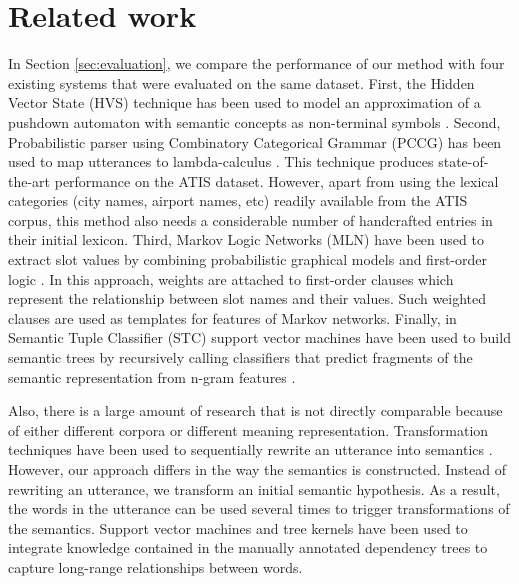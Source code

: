 \documentclass{article}
\begin{document}
\section{Related work}

In Section \ref{sec:evaluation}, we compare the performance of our method with four existing systems that were evaluated on the same dataset. 
First, the Hidden Vector State (HVS) technique has been used to model an approximation of a pushdown automaton with semantic concepts as non-terminal symbols \cite{he05,jurcicek08}. 
Second, Probabilistic parser using Combinatory Categorical Grammar   (PCCG) has been used to map utterances to lambda-calculus \cite{zettlemoyer07}. 
This technique produces state-of-the-art performance on the ATIS dataset. However, apart from using the lexical categories (city names, airport names, etc) readily available from the ATIS corpus, this method also needs a considerable number of handcrafted entries in their initial lexicon. 
Third, Markov Logic Networks (MLN) have been used to extract slot values by combining probabilistic graphical models and first-order logic \cite{meza08b}. In this approach, weights are attached to first-order clauses which represent the relationship between slot names and their values. Such weighted clauses are used as templates for features of Markov networks.
Finally, in Semantic Tuple Classifier (STC) support vector machines have been used to build semantic trees by recursively calling classifiers that predict fragments of the semantic representation from n-gram features \cite{mairesse09}.

Also, there is a large amount of research that is not directly comparable because of either different corpora or different meaning representation. 
Transformation techniques have been used to sequentially rewrite an utterance into semantics \cite{kate05}. However, our approach differs in the way the semantics is constructed. Instead of rewriting an utterance, we transform an initial semantic hypothesis. As a result, the words in the utterance can be used several times to trigger transformations of the semantics. 
Support vector machines and tree kernels \cite{kate08} have been used to integrate knowledge contained in the manually annotated dependency trees to capture long-range relationships between words.
\end{document}
